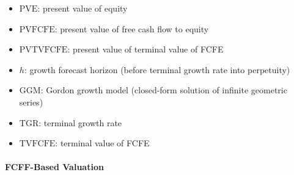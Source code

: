\begin{itemize}
  \item[] $\text{PVE}$: present value of equity
  \item[] $\text{PVFCFE}$: present value of free cash flow to equity
  \item[] $\text{PVTVFCFE}$: present value of terminal value of FCFE
  \item[] $h$: growth forecast horizon (before terminal growth rate into perpetuity)
  \item[] $\text{GGM}$: Gordon growth model (closed-form solution of infinite geometric series)
  \item[] $\text{TGR}$: terminal growth rate
  \item[] $\text{TVFCFE}$: terminal value of FCFE
\end{itemize}

\paragraph{FCFF-Based Valuation}


